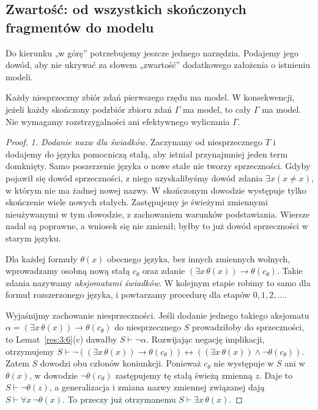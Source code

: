 \subsection*{Zwartość: od wszystkich skończonych fragmentów do modelu}\label{sec:14:3}
Do kierunku „w górę” potrzebujemy jeszcze jednego narzędzia. Podajemy jego dowód, aby nie ukrywać za słowem „zwartość” dodatkowego założenia o istnieniu modeli.

\begin{lemat}\label{res:14:7}
Każdy niesprzeczny zbiór zdań pierwszego rzędu ma model. W konsekwencji, jeżeli każdy skończony podzbiór zbioru zdań $\Gamma$ ma model, to cały $\Gamma$ ma model. Nie wymagamy rozstrzygalności ani efektywnego wyliczania $\Gamma$.
\end{lemat}
\begin{proof}
\emph{1. Dodanie nazw dla świadków.} Zaczynamy od niesprzecznego $T$ i dodajemy do języka pomocniczą stałą, aby istniał przynajmniej jeden term domknięty. Samo poszerzenie języka o nowe stałe nie tworzy sprzeczności. Gdyby pojawił się dowód sprzeczności, z niego uzyskalibyśmy dowód zdania $\exists x(x\ne x)$, w którym nie ma żadnej nowej nazwy. W skończonym dowodzie występuje tylko skończenie wiele nowych stałych. Zastępujemy je świeżymi zmiennymi nieużywanymi w tym dowodzie, z zachowaniem warunków podstawiania. Wiersze nadal są poprawne, a wniosek się nie zmienił; byłby to już dowód sprzeczności w starym języku.

Dla każdej formuły $\theta(x)$ obecnego języka, bez innych zmiennych wolnych, wprowadzamy osobną nową stałą $c_\theta$ oraz zdanie $(\exists x\,\theta(x))\to\theta(c_\theta)$. Takie zdania nazywamy \emph{aksjomatami świadków}. W kolejnym etapie robimy to samo dla formuł rozszerzonego języka, i powtarzamy procedurę dla etapów $0,1,2,\ldots$.

Wyjaśnijmy zachowanie niesprzeczności. Jeśli dodanie jednego takiego aksjomatu $\alpha=(\exists x\,\theta(x))\to\theta(c_\theta)$ do niesprzecznego $S$ prowadziłoby do sprzeczności, to Lemat~\ref{res:3:6}(c) dawałby $S\vdash\neg\alpha$. Rozwijając negację implikacji, otrzymujemy $S\vdash\neg((\exists x\,\theta(x))\to\theta(c_\theta))\leftrightarrow((\exists x\,\theta(x))\land\neg\theta(c_\theta))$. Zatem $S$ dowodzi obu członów koniunkcji. Ponieważ $c_\theta$ nie występuje w $S$ ani w $\theta(x)$, w dowodzie $\neg\theta(c_\theta)$ zastępujemy tę stałą świeżą zmienną $z$. Daje to $S\vdash\neg\theta(z)$, a generalizacja i zmiana nazwy zmiennej związanej dają $S\vdash\forall x\,\neg\theta(x)$. To przeczy już otrzymanemu $S\vdash\exists x\,\theta(x)$.


\end{proof}

